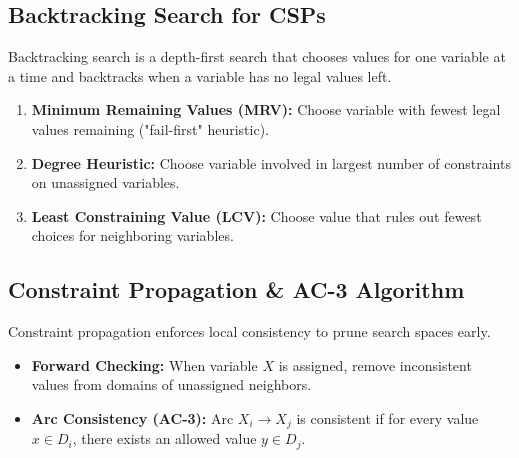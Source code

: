 \documentclass[12pt,a4paper]{article}
\begin{document}
\begin{tcolorbox}[tikzbox, title={Constraint Graph Representation (Map Coloring Example)}]
\centering
{}
\end{tcolorbox}

\subsection{Backtracking Search for CSPs}
Backtracking search is a depth-first search that chooses values for one variable at a time and backtracks when a variable has no legal values left.

\begin{tcolorbox}[examplebox, title={Heuristics for CSP Backtracking}]
  \begin{enumerate}[leftmargin=*, noitemsep]
    \item \textbf{Minimum Remaining Values (MRV):} Choose variable with fewest legal values remaining ("fail-first" heuristic).
    \item \textbf{Degree Heuristic:} Choose variable involved in largest number of constraints on unassigned variables.
    \item \textbf{Least Constraining Value (LCV):} Choose value that rules out fewest choices for neighboring variables.
  \end{enumerate}
\end{tcolorbox}

\subsection{Constraint Propagation \& AC-3 Algorithm}
Constraint propagation enforces local consistency to prune search spaces early.

\begin{itemize}[leftmargin=*, itemsep=3pt]
  \item \textbf{Forward Checking:} When variable $X$ is assigned, remove inconsistent values from domains of unassigned neighbors.
  \item \textbf{Arc Consistency (AC-3):} Arc $X_i \to X_j$ is consistent if for every value $x \in D_i$, there exists an allowed value $y \in D_j$.
\end{itemize}
\end{document}
